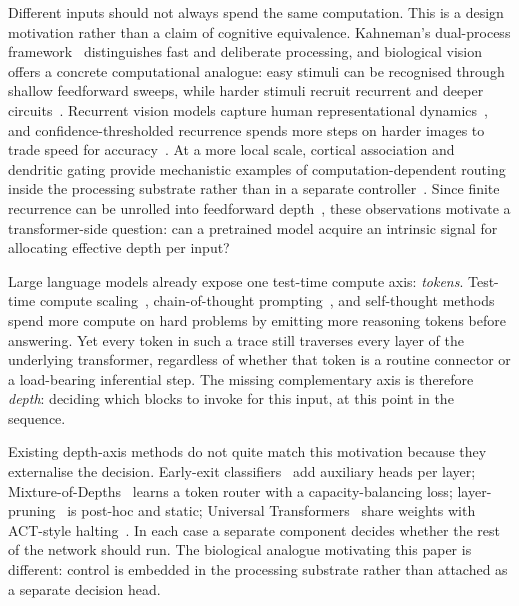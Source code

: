 \documentclass{article}
\begin{document}
Different inputs should not always spend the same computation. This is a design motivation rather than a claim of cognitive equivalence. Kahneman's dual-process framework~\citep{kahneman2011thinking} distinguishes fast and deliberate processing, and biological vision offers a concrete computational analogue: easy stimuli can be recognised through shallow feedforward sweeps, while harder stimuli recruit recurrent and deeper circuits~\citep{lamme2000distinct, kar2019recurrent, dicarlo2012does}. Recurrent vision models capture human representational dynamics~\citep{kietzmann2019recurrence}, and confidence-thresholded recurrence spends more steps on harder images to trade speed for accuracy~\citep{spoerer2020recurrent}. At a more local scale, cortical association and dendritic gating provide mechanistic examples of computation-dependent routing inside the processing substrate rather than in a separate controller~\citep{bastos2012canonical, buschman2007topdown, larkum2013cellular}. Since finite recurrence can be unrolled into feedforward depth~\citep{vanbergen2020going}, these observations motivate a transformer-side question: can a pretrained model acquire an intrinsic signal for allocating effective depth per input?

Large language models already expose one test-time compute axis: \emph{tokens}. Test-time compute scaling~\citep{openai2024o1, deepseek2025r1, snell2024scaling}, chain-of-thought prompting~\citep{wei2022chain}, and self-thought methods~\citep{zelikman2024quietstar} spend more compute on hard problems by emitting more reasoning tokens before answering. Yet every token in such a trace still traverses every layer of the underlying transformer, regardless of whether that token is a routine connector or a load-bearing inferential step. The missing complementary axis is therefore \emph{depth}: deciding which blocks to invoke for this input, at this point in the sequence.

Existing depth-axis methods do not quite match this motivation because they externalise the decision. Early-exit classifiers~\citep{schuster2022confident, elbayad2020depth} add auxiliary heads per layer; Mixture-of-Depths~\citep{raposo2024mixture} learns a token router with a capacity-balancing loss; layer-pruning~\citep{gromov2024unreasonable, men2024shortgpt} is post-hoc and static; Universal Transformers~\citep{dehghani2018universal} share weights with ACT-style halting~\citep{graves2016adaptive}. In each case a separate component decides whether the rest of the network should run. The biological analogue motivating this paper is different: control is embedded in the processing substrate rather than attached as a separate decision head.
\end{document}
